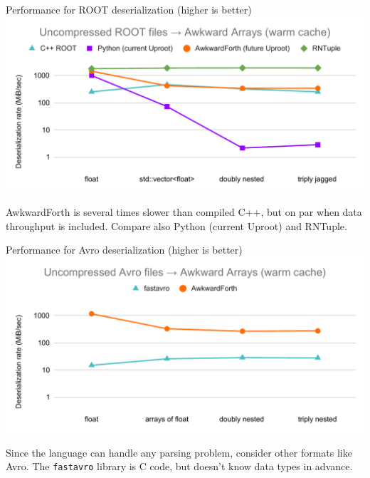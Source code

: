 \documentclass[aspectratio=169]{beamer}
\begin{document}
\begin{frame}{Performance for ROOT deserialization (higher is better)}
\large
\vspace{0.2 cm}
\includegraphics[width=0.95\linewidth]{AwkwardForth-performance-ROOT.pdf}

AwkwardForth is several times slower than compiled C++, but on par when data throughput is included. Compare also Python (current Uproot) and RNTuple.
\end{frame}

\begin{frame}{Performance for Avro deserialization (higher is better)}
\large
\vspace{0.2 cm}
\includegraphics[width=0.95\linewidth]{AwkwardForth-performance-Avro.pdf}

Since the language can handle any parsing problem, consider other formats like Avro. The \texttt{fastavro} library is C code, but doesn't know data types in advance.
\end{frame}
\end{document}
